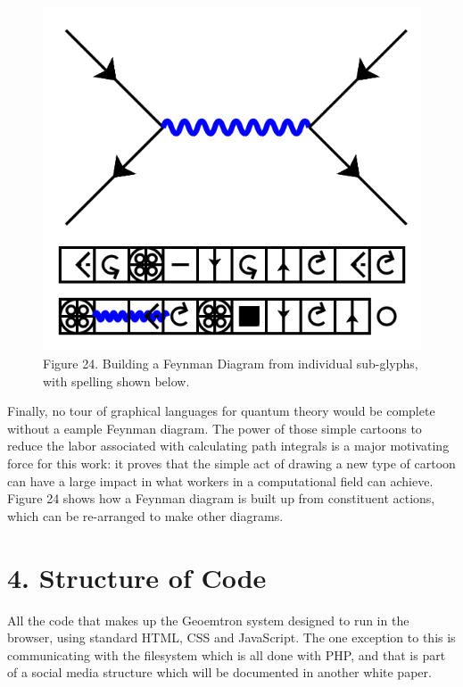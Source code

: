 \documentclass[11pt]{article}
\begin{document}
\begin{figure}

\includegraphics[width=\linewidth]{figures/figure24_feynman1.png}

\caption{Figure 24. Building a Feynman Diagram from individual sub-glyphs, with spelling shown below.}
\end{figure}




    Finally, no tour of graphical languages for quantum theory would be complete without a eample Feynman diagram.  The power of those simple cartoons to reduce the labor associated with calculating path integrals is a major motivating force for this work: it proves that the simple act of drawing a new type of cartoon can have a large impact in what workers in a computational field can achieve.  Figure 24 shows how a Feynman diagram is built up from constituent actions, which can be re-arranged to make other diagrams. 




\section{
4. Structure of Code}




    All the code that makes up the Geoemtron system designed to run in the browser, using standard HTML, CSS and JavaScript.  The one exception to this is communicating with the filesystem which is all done with PHP, and that is part of a social media structure which will be documented in another white paper.  
\end{document}
